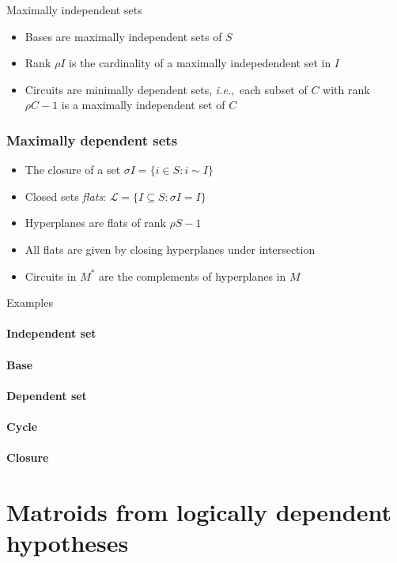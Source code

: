 \documentclass[bigger]{beamer}
\newcommand{\ie}{{\em i.e.},~}
\begin{document}
\begin{frame}{Maximally independent sets}
  \begin{itemize}
  \item Bases are maximally independent sets of $S$
  \item Rank $\rho I$ is the cardinality of a maximally indepedendent set in $I$
  \item Circuits are minimally dependent sets, \ie each subset of $C$
    with rank $\rho C - 1$ is a maximally independent set of $C$
  \end{itemize}
\end{frame}

\begin{frame}
\frametitle{Maximally dependent sets}
\begin{itemize}
\item The closure of a set $\sigma I = \{i \in S: i \sim I\}$
\item Closed sets {\em flats}: $\mathscr{L} = \{I \subseteq S: \sigma I = I\}$
\item Hyperplanes are flats of rank $\rho S - 1$
\item All flats are given by closing hyperplanes under intersection
\item Circuits in $M^*$ are the complements of hyperplanes in $M$
\end{itemize} %
\end{frame}



\begin{frame}{Examples}
\framesubtitle<1>{Independent set}  
\framesubtitle<2>{Base}  
\framesubtitle<4>{Dependent set}  
\framesubtitle<3>{Cycle}  
\framesubtitle<5>{Closure}  
\end{frame}

\section{Matroids from logically dependent hypotheses}
\end{document}
